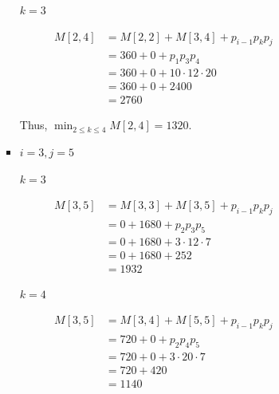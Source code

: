 \documentclass[12pt]{article}
\begin{document}
\begin{enumerate}[1.]
\begin{itemize}
\begin{itemize}
\begin{enumerate}[1.]
\begin{enumerate}[1)]
\begin{itemize}
                        \bigskip

                        \underline{$k = 3$}

                        \begin{align}
                            M[2,4] &= M[2,2] + M[3,4] + p_{i-1}p_kp_j\\
                            &= 360 + 0 + p_1p_3p_4\\
                            &= 360 + 0 + 10 \cdot 12 \cdot 20\\
                            &= 360 + 0 + 2400\\
                            &= 2760
                        \end{align}

                        \bigskip

                        Thus, $\min_{2 \leq k \leq 4} M[2,4] = 1320$.

                        \item $i = 3, j = 5$

                        \bigskip

                        \underline{$k = 3$}

                        \begin{align}
                            M[3,5] &= M[3,3] + M[3,5] + p_{i-1}p_kp_j\\
                            &= 0 + 1680 + p_2p_3p_5\\
                            &= 0 + 1680 + 3 \cdot 12 \cdot 7\\
                            &= 0 + 1680 + 252\\
                            &= 1932
                        \end{align}

                        \bigskip

                        \underline{$k = 4$}

                        \begin{align}
                            M[3,5] &= M[3,4] + M[5,5] + p_{i-1}p_kp_j\\
                            &= 720 + 0 + p_2p_4p_5\\
                            &= 720 + 0 + 3 \cdot 20 \cdot 7\\
                            &= 720 + 420\\
                            &= 1140
                        \end{align}


\end{itemize}
\end{enumerate}
\end{enumerate}
\end{itemize}
\end{itemize}
\end{enumerate}
\end{document}
